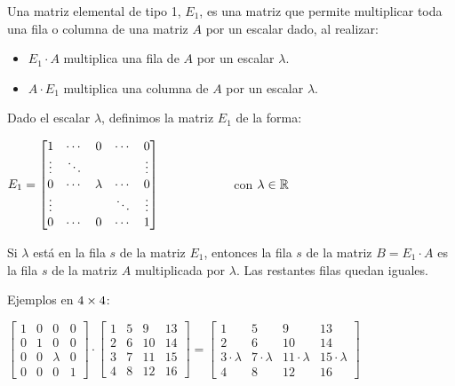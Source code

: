 \documentclass[]{article}
\begin{document}
Una matriz elemental de tipo 1, $E_1$, es una matriz que permite multiplicar toda una fila o columna de una matriz $A$ por un escalar dado, al realizar:
\begin{itemize}
	\item $E_1\cdot A$ multiplica una fila de $A$ por un escalar $\lambda$.
	\item $A\cdot E_1$ multiplica una columna de $A$ por un escalar $\lambda$.
\end{itemize}

Dado el escalar $\lambda$, definimos la matriz $E_1$ de la forma:
\begin{center}
	$E_1 =\begin{bmatrix}
		1 & \cdots & 0 & \cdots & 0 \\
		\vdots  & \ddots &   &        & \vdots  \\
		0 & \cdots & \lambda & \cdots & 0\\
		\vdots & & &\ddots & \vdots \\
		0&\cdots & 0 & \cdots & 1
	\end{bmatrix} \hspace{2cm}$ con $\lambda\in\mathbb{R}$
\end{center}


Si $\lambda$ está en la fila $s$ de la matriz $E_1$, entonces la fila $s$ de la matriz $B = E_1 \cdot A$ es la fila $s$ de la matriz $A$ multiplicada por $\lambda$. Las restantes filas quedan iguales.

Ejemplos en $4\times 4$:
\begin{center}
	$\begin{bmatrix}
		1&0&0&0 \\
		0&1&0&0 \\
		0&0&\lambda&0 \\
		0&0&0&1
	\end{bmatrix} \cdot
	\begin{bmatrix}
		1&5&9&13 \\
		2&6&10&14 \\
		3&7&11&15 \\
		4&8&12&16
	\end{bmatrix} =
	\begin{bmatrix}
		1&5&9&13 \\
		2&6&10&14 \\
		3\cdot\lambda&7\cdot\lambda&11\cdot\lambda&15\cdot\lambda \\
		4&8&12&16
	\end{bmatrix}
	$
\end{center}
\end{document}
